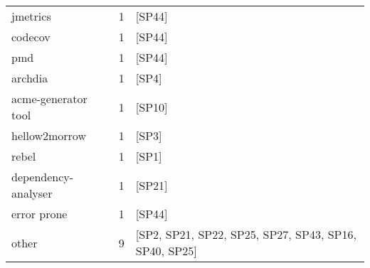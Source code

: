 \begin{tabular}{lrl}
            jmetrics &      1 &                                                 [SP44] \\
             codecov &      1 &                                                 [SP44] \\
                 pmd &      1 &                                                 [SP44] \\
             archdia &      1 &                                                  [SP4] \\
 acme-generator tool &      1 &                                                 [SP10] \\
       hellow2morrow &      1 &                                                  [SP3] \\
               rebel &      1 &                                                  [SP1] \\
 dependency-analyser &      1 &                                                 [SP21] \\
         error prone &      1 &                                                 [SP44] \\
               other &      9 &  [SP2, SP21, SP22, SP25, SP27, SP43, SP16, SP40, SP25] \\
\bottomrule
\end{tabular}
